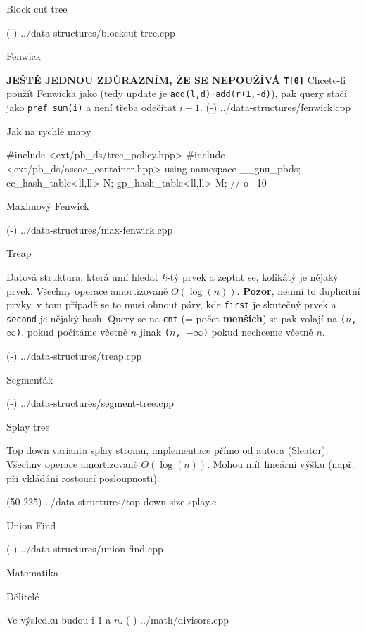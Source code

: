 \sec Block cut tree 

\verbinput (-) ../data-structures/blockcut-tree.cpp

\sec Fenwick

{\bf JEŠTĚ JEDNOU ZDŮRAZNÍM, ŽE SE NEPOUŽÍVÁ {\tt T[0]}}\linebreak
Chcete-li použít Fenwicka jako  (tedy update je {\tt add(l,d)+add(r+1,-d)}), pak query stačí jako {\tt pref\_sum(i)} a není třeba odečítat $i-1$.
\verbinput (-) ../data-structures/fenwick.cpp

\sec Jak na rychlé mapy 

\begtt
#include <ext/pb_ds/tree_policy.hpp>
#include <ext/pb_ds/assoc_container.hpp>
using namespace __gnu_pbds;
cc_hash_table<ll,ll> N;
gp_hash_table<ll,ll> M; // o ~10%
\endtt

\sec Maximový Fenwick 

\verbinput (-) ../data-structures/max-fenwick.cpp

\sec Treap

Datová struktura, která umí hledat $k$-tý prvek a zeptat se, kolikátý je nějaký prvek.
Všechny operace amortizovaně $O(\log(n))$.
{\bf Pozor}, neumí to duplicitní prvky, v tom případě se to musí ohnout páry, kde {\tt first} je skutečný prvek a {\tt second} je nějaký hash.
Query se na {\tt cnt} (= počet {\bf menších}) se pak volají na {\tt ($n$, $\infty$)}, pokud počítáme včetně $n$ jinak {\tt ($n$, $-\infty$)} pokud nechceme včetně $n$.

\verbinput (-) ../data-structures/treap.cpp

\sec Segmenťák

\verbinput (-) ../data-structures/segment-tree.cpp

\sec Splay tree

Top down varianta splay stromu, implementace přímo od autora (Sleator).
Všechny operace amortizovaně $O(\log(n))$.
Mohou mít lineární výšku (např. při vkládání rostoucí posloupnosti).

\verbinput (50-225) ../data-structures/top-down-size-splay.c

\sec Union Find 

\verbinput (-) ../data-structures/union-find.cpp

\newpage

\chap Matematika

\sec Dělitelé 

Ve výsledku budou i $1$ a $n$.
\verbinput (-) ../math/divisors.cpp

